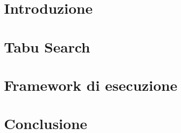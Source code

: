 \documentclass[a4paper,12pt,draft]{article}
\begin{document}


\begingroup
	\hypersetup{linkcolor=black}
	\setcounter{tocdepth}{2}
	\tableofcontents
\endgroup

\newpage

\section{Introduzione}


\section{Tabu Search}


\section{Framework di esecuzione}


\section{Conclusione}



{}


\end{document}
